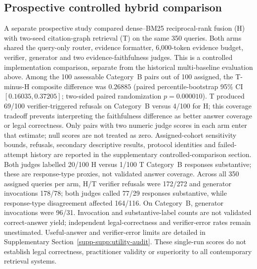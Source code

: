 \subsection{Prospective controlled hybrid comparison}
\label{subsec:matched-comparison}
A separate prospective study compared dense--BM25 reciprocal-rank fusion (H) with two-seed citation-graph retrieval (T) on the same 350 queries. Both arms shared the query-only router, evidence formatter, 6,000-token evidence budget, verifier, generator and two evidence-faithfulness judges. This is a controlled implementation comparison, separate from the historical multi-baseline evaluation above. Among the 100 assessable Category~B pairs out of 100 assigned, the T-minus-H composite difference was $0.26885$ (paired percentile-bootstrap 95\% CI $[0.16035, 0.37205]$; two-sided paired randomization $p=0.000010$). T produced 69/100 verifier-triggered refusals on Category~B versus 4/100 for H; this coverage tradeoff prevents interpreting the faithfulness difference as better answer coverage or legal correctness. Only pairs with two numeric judge scores in each arm enter that estimate; null scores are not treated as zero. Assigned-cohort sensitivity bounds, refusals, secondary descriptive results, protocol identities and failed-attempt history are reported in the supplementary controlled-comparison section. Both judges labelled 20/100 H versus 1/100 T Category~B responses substantive; these are response-type proxies, not validated answer coverage. Across all 350 assigned queries per arm, H/T verifier refusals were 172/272 and generator invocations 178/78; both judges called 77/29 responses substantive, while response-type disagreement affected 164/116. On Category~B, generator invocations were 96/31. Invocation and substantive-label counts are not validated correct-answer yield; independent legal-correctness and verifier-error rates remain unestimated. Useful-answer and verifier-error limits are detailed in Supplementary Section~\ref{supp-supp:utility-audit}. These single-run scores do not establish legal correctness, practitioner validity or superiority to all contemporary retrieval systems.
